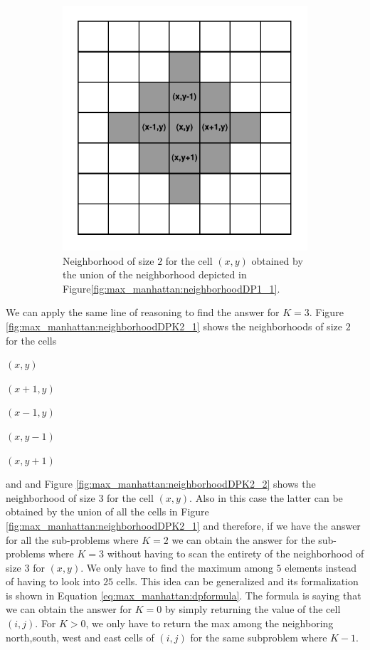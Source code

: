 \begin{figure}
    \begin{subfigure}[t]{0.4\textwidth}
        \centering
        \includegraphics[width=\textwidth]{sources/max_manhattan/images/neighborhoodDP1_2}
        \caption[]{Neighborhood of size $2$ for the cell $(x,y)$ obtained by the union of the
        neighborhood depicted in Figure\ref{fig:max_manhattan:neighborhoodDP1_1}.}
        \label{fig:max_manhattan:neighborhoodDP1_2}
     \end{subfigure}
     \label{}
     \caption{}
\end{figure}

We can apply the same line of reasoning to find the answer for $K=3$. Figure
\ref{fig:max_manhattan:neighborhoodDPK2_1} shows  the neighborhoods of size $2$ for the cells 
\begin{itemize*}
    \item $(x,y)$
    \item $(x+1,y)$
    \item $(x-1,y)$
    \item $(x,y-1)$
    \item $(x,y+1)$ \end{itemize*} and and Figure \ref{fig:max_manhattan:neighborhoodDPK2_2} shows
the neighborhood of size $3$ for the cell $(x,y)$. Also in this case the latter can be obtained by
the union of all the cells in Figure \ref{fig:max_manhattan:neighborhoodDPK2_1} and therefore, if we
have the answer for all the sub-problems where $K=2$ we can obtain the answer for the sub-problems
where $K=3$ without having to scan the entirety of the neighborhood of size $3$ for $(x,y)$. We only
have to find the maximum among $5$ elements instead of having to look into $25$ cells. This idea can
be generalized and its formalization is shown in Equation \ref{eq:max_manhattan:dpformula}. The
formula is saying that we can obtain the answer for $K=0$  by simply returning the value of
the cell $(i,j)$. For $K>0$, we only have to return the max among the neighboring north,south, west
and east cells of $(i,j)$ for the same subproblem where $K-1$.

